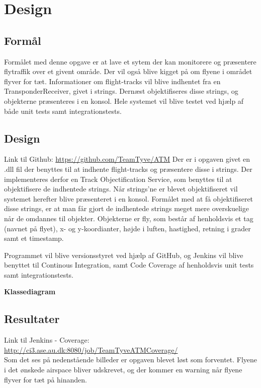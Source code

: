 \chapter{Design}
\section{Formål}
Formålet med denne opgave er at lave et sytem der kan monitorere og præsentere flytraffik over et givent område. Der vil også blive kigget på om flyene i området flyver for tæt. Informationer om flight-tracks vil blive indhentet fra en TransponderReceiver, givet i strings. Dernæst objektifiseres disse strings, og objekterne præsenteres i en konsol. 
Hele systemet vil blive testet ved hjælp af både unit tests samt integrationstests.


\section{Design}
Link til Github: \url{https://github.com/TeamTyve/ATM} \newline \newline 
Der er i opgaven givet en .dll fil der benyttes til at indhente flight-tracks og præsentere disse i strings. Der implementeres derfor en Track Objectification Service, som benyttes til at objektifisere de indhentede strings. \tabularnewline
Når strings'ne er blevet objektifiseret vil systemet herefter blive præsenteret i en konsol. \newline
Formålet med at få objektifiseret disse strings, er at man får gjort de indhentede strings meget mere overskuelige når de omdannes til objekter. \newline
Objekterne er fly, som består af henholdsvis et tag (navnet på flyet), x- og y-koordianter, højde i luften, hastighed, retning i grader samt et timestamp.


Programmet vil blive versionsstyret ved hjælp af GitHub, og Jenkins vil blive benyttet til Continous Integration, samt Code Coverage af henholdsvis unit tests samt integrationstests.

\textbf{Klassediagram}


\section{Resultater}
Link til Jenkins - Coverage: \url{http://ci3.ase.au.dk:8080/job/TeamTyveATMCoverage/} \\
Som det ses på nedenstående billeder er opgaven blevet løst som forventet. Flyene i det ønskede airspace bliver udskrevet, og der kommer en warning når flyene flyver for tæt på hinanden.




